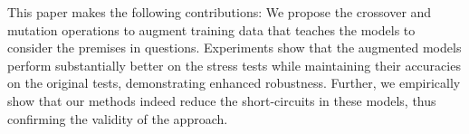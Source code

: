 

This paper makes the following contributions:
We propose the crossover and mutation operations
to augment training data that teaches the models to consider 
the premises in questions. Experiments show that the augmented models 
perform substantially better on the stress tests while maintaining their
accuracies on the original tests, demonstrating enhanced robustness.
Further, we empirically show that our methods indeed reduce the short-circuits
in these models, thus confirming the validity of the approach.







